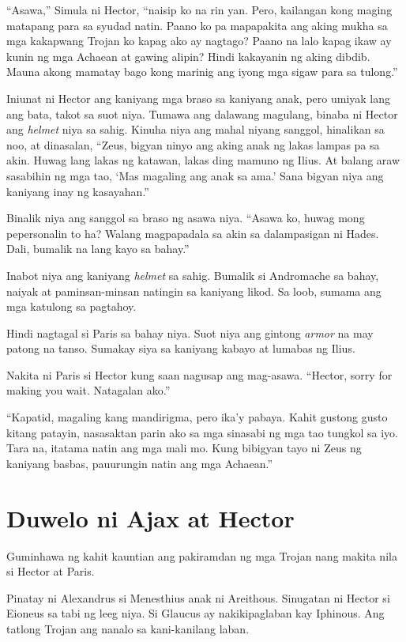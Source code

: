 \documentclass[12pt,letterpaper]{report}
\begin{document}
``Asawa,'' Simula ni Hector, ``naisip ko na rin yan. Pero, kailangan kong maging matapang para sa syudad natin. Paano ko pa mapapakita ang aking mukha sa mga kakapwang Trojan ko kapag ako ay nagtago? Paano na lalo kapag ikaw ay kunin ng mga Achaean at gawing alipin? Hindi kakayanin ng aking dibdib. Mauna akong mamatay bago kong marinig ang iyong mga sigaw para sa tulong.''

Iniunat ni Hector ang kaniyang mga braso sa kaniyang anak, pero umiyak lang ang bata, takot sa suot niya. Tumawa ang dalawang magulang, binaba ni Hector ang \textit{helmet} niya sa sahig. Kinuha niya ang mahal niyang sanggol, hinalikan sa noo, at dinasalan, ``Zeus, bigyan ninyo ang aking anak ng lakas lampas pa sa akin. Huwag lang lakas ng katawan, lakas ding mamuno ng Ilius. At balang araw sasabihin ng mga tao, `Mas magaling ang anak sa ama.' Sana bigyan niya ang kaniyang inay ng kasayahan.''

Binalik niya ang sanggol sa braso ng asawa niya. ``Asawa ko, huwag mong pepersonalin to ha? Walang magpapadala sa akin sa dalampasigan ni Hades. Dali, bumalik na lang kayo sa bahay.''

Inabot niya ang kaniyang \textit{helmet} sa sahig. Bumalik si Andromache sa bahay, naiyak at paminsan-minsan natingin sa kaniyang likod. Sa loob, sumama ang mga katulong sa pagtahoy.

Hindi nagtagal si Paris sa bahay niya. Suot niya ang gintong \textit{armor} na may patong na tanso. Sumakay siya sa kaniyang kabayo at lumabas ng Ilius.

Nakita ni Paris si Hector kung saan nagusap ang mag-asawa. ``Hector, sorry for making you wait. Natagalan ako.''

``Kapatid, magaling kang mandirigma, pero ika'y pabaya. Kahit gustong gusto kitang patayin, nasasaktan parin ako sa mga sinasabi ng mga tao tungkol sa iyo. Tara na, itatama natin ang mga mali mo. Kung bibigyan tayo ni Zeus ng kaniyang basbas, pauurungin natin ang mga Achaean.''

\pagebreak
\chapter{Duwelo ni Ajax at Hector}

Guminhawa ng kahit kauntian ang pakiramdan ng mga Trojan nang makita nila si Hector at Paris.

Pinatay ni Alexandrus si Menesthius anak ni Areithous. Sinugatan ni Hector si Eioneus sa tabi ng leeg niya. Si Glaucus ay nakikipaglaban kay Iphinous. Ang tatlong Trojan ang nanalo sa kani-kanilang laban.
\end{document}
